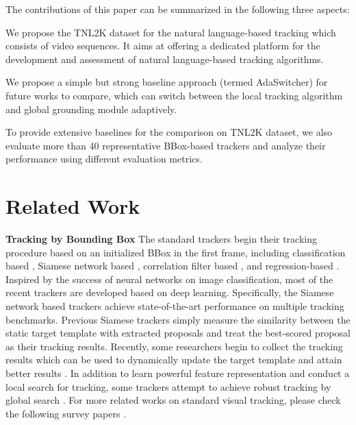 \documentclass[final]{cvpr}
\begin{document}
 

The contributions of this paper can be summarized in the following three aspects: 

 We propose the TNL2K dataset for the natural language-based tracking which consists of  video sequences. It aims at offering a dedicated platform for the development and assessment of natural language-based tracking algorithms. 

  We propose a simple but strong baseline approach (termed AdaSwitcher) for future works to compare, which can switch between the local tracking algorithm and global grounding module adaptively.  

  To provide extensive baselines for the comparison on TNL2K dataset, we also evaluate more than 40 representative BBox-based trackers and analyze their performance using different evaluation metrics. 















\section{Related Work} 

\textbf{Tracking by Bounding Box }
The standard trackers begin their tracking procedure based on an initialized BBox in the first frame, including classification based \cite{Nam2015Learning, Jung_2018_ECCV, Park_2018_ECCV, han2017branchout}, Siamese network based \cite{Wang_2018_CVPR, li2018siamrpn++, xu2020siamfc++, danelljan2019atom, danelljan2020PRDiMP}, correlation filter based \cite{lukezic2017discriminative, Danelljan2016Beyond, Henriques2015High, Danelljan2015Learning}, and regression-based \cite{held2016GOTURN}. Inspired by the success of neural networks on image classification, most of the recent trackers are developed based on deep learning. Specifically, the Siamese network based trackers achieve state-of-the-art performance on multiple tracking benchmarks. Previous Siamese trackers simply measure the similarity between the static target template with extracted proposals and treat the best-scored proposal as their tracking results. Recently, some researchers begin to collect the tracking results which can be used to dynamically update the target template and attain better results \cite{Yang_2018_ECCV, zhang2019UpdateNet}. In addition to learn powerful feature representation and conduct a local search for tracking, some trackers attempt to achieve robust tracking by global search \cite{Goutam2020KYS, voigtlaender2020siamRCNN, yan2019skimming, wang2019GANTrack, huang2019globaltrack, deepMTA}.  For more related works on standard visual tracking, please check the following survey papers \cite{li2013survey, Smeulders2014Visual, Yilmaz2006Object, marvasti2019TrackSurvey, li2018TrackSurvey}.  
\end{document}
